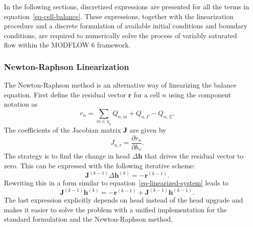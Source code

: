 \documentclass[fleqn]{article}
\begin{document}
In the following sections, discretized expressions are presented for
all the terms in equation~\ref{eq-cell-balance}. These expressions,
together with the linearization procedure and a discrete
formulation of available initial conditions and boundary conditions, 
are required to numerically solve the process of variably saturated 
flow within the MODFLOW 6 framework.

\subsubsection*{Newton-Raphson Linearization}
The Newton-Raphson method is an alternative way of linearizing the
balance equation. First define the residual vector $\mathbf{r}$
for a cell $n$ using the component notation as
\begin{equation}
  r_n = \sum_{m \in \eta_n} Q_{n,m} + 
  Q_{n, \Gamma} - 
  Q_{n,\Sigma}.
  \label{eq-residual-cell}
\end{equation}
The coefficients of the Jacobian matrix $\mathbf{J}$ are given by
\begin{equation}
  J_{n,r} = \frac{\partial r_n}{\partial h_r}.
  \label{eq-jacobian}
\end{equation}
The strategy is to find the change in head $\Delta\mathbf{h}$ that
drives the residual vector to zero. This can be expressed with the
following iterative scheme:
\begin{equation}
  \mathbf{J}^{(k-1)} \Delta \mathbf{h}^{(k)} = -\mathbf{r}^{(k-1)}.
\end{equation}
Rewriting this in a form similar to equation~\ref{eq-linearized-system}
leads to
\begin{equation}
  \mathbf{J}^{(k-1)} \mathbf{h}^{(k)} = 
  -\mathbf{r}^{(k-1)} + \mathbf{J}^{(k-1)} \mathbf{h}^{(k-1)}.
  \label{eq-newton-head}
\end{equation}
The last expression explicitly depends on head instead of the
head upgrade and makes it easier to solve the problem with a
unified implementation for the standard formulation and the
Newton-Raphson method.
\end{document}
